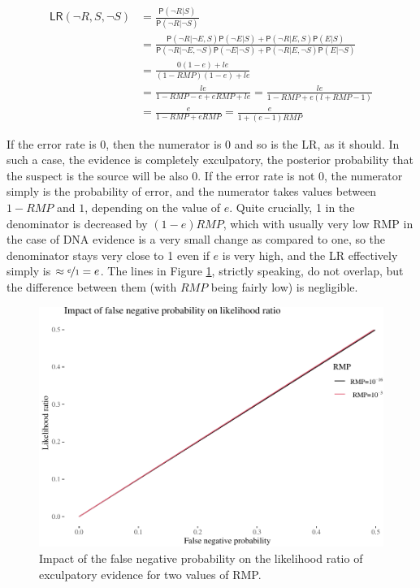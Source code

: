 \documentclass[
  10pt,
  dvipsnames,enabledeprecatedfontcommands]{scrartcl}
\newcommand{\n}{\neg}
\newcommand{\pr}[1]{\mathsf{P}(#1)}
\begin{document}
\begin{align*}
\mathsf{LR}(\n R, S, \n S) & = \frac{\pr{\n R \vert S}}{\pr{\n R \vert \n S}} \\
& = \frac{\pr{\n R \vert \n E, S}\pr{\n E \vert S} + \pr{\n R \vert E, S}\pr{E \vert S}}
{\pr{\n R \vert \n E, \n S}\pr{\n E \vert \n S} + \pr{\n R \vert E,\n S}\pr{E \vert \n S}} \\
& = \frac{0 (1-e) +  le}
{(1-RMP)(1-e) + le} \\
& = \frac{le}
{1- RMP - e + eRMP + le} = \frac{le}{1-RMP + e(l + RMP -1)}\\
& = \frac{e}{1 - RMP + eRMP} = \frac{e}{1+(e-1)RMP}
\end{align*}

\noindent If the error rate is 0, then the numerator is 0 and so is the
\textsf{LR}, as it should. In such a case, the evidence is completely
exculpatory, the posterior probability that the suspect is the source
will be also 0. If the error rate is not 0, the numerator simply is the
probability of error, and the numerator takes values between \(1-RMP\)
and \(1\), depending on the value of \(e\). Quite crucially, 1 in the
denominator is decreased by \((1-e)RMP\), which with usually very low
RMP in the case of DNA evidence is a very small change as compared to
one, so the denominator stays very close to 1 even if \(e\) is very
high, and the \textsf{LR} effectively simply is
\(\approx \nicefrac{e}{1} = e\). The lines in Figure \ref{fig:fnplr},
strictly speaking, do not overlap, but the difference between them (with
\(RMP\) being fairly low) is negligible.

\begin{figure}

\begin{center}\includegraphics[width=1\linewidth]{lr-chapter4_files/figure-latex/fig-fnplr-1} \end{center}
\label{fig:fnplr}
\caption{Impact of the false negative probability on the likelihood ratio of exculpatory evidence for two values of RMP.}
\end{figure}
\end{document}
